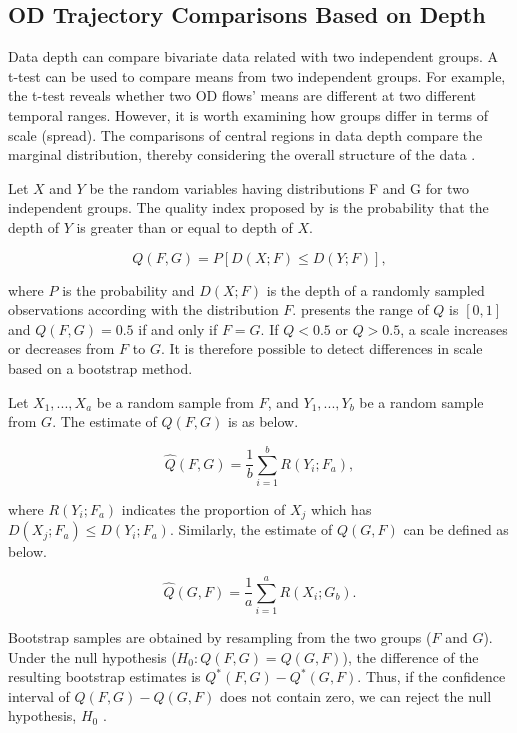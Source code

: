 \documentclass[a4paper,UKenglish]{lipics-v2016}
\begin{document}
\subsection{OD Trajectory Comparisons Based on Depth}
Data depth can compare bivariate data related with two independent groups. A t-test can be used to compare  means from two independent groups. For example, the t-test reveals whether two OD flows' means  are different at two different temporal ranges. However, it is worth examining how groups differ in terms of scale (spread). The comparisons of central regions in data depth compare the marginal distribution, thereby considering the overall structure of the data \cite{wilcox03MBR}.

Let $X$ and $Y$ be the random variables having distributions F and G for two independent groups. The quality index proposed by \cite{liu93JASA} is the probability that the depth of $Y$ is greater than or equal to depth of $X$. 

\begin{equation*}
Q(F,G) = P[D(X;F) \leq D(Y;F)],
\end{equation*}

where $P$ is the probability and $D(X;F)$ is the depth of a randomly sampled observations according with the distribution $F$. \cite{liu93JASA} presents the range of $Q$ is $[0,1]$ and $Q(F,G) = 0.5$ if and only if $F = G$. If $Q < 0.5$  or $Q > 0.5$, a scale increases or decreases from  $F$ to $G$.   It is therefore possible to detect differences in scale based on a bootstrap method.

Let $X_1,...,X_a$ be a random sample from $F$, and $Y_1,...,Y_b$ be a random sample from $G$. The estimate of $Q(F,G)$ is as below.

\begin{equation*}
\hat{Q}(F,G) =\frac{1}{b} \sum_{i=1}^{b} R(Y_i;F_a),
\end{equation*}

where $R(Y_i;F_a)$ indicates the proportion of $X_j$ which has $D(X_j;F_a) \leq D(Y_i;F_a)$. Similarly, the estimate of $Q(G,F)$ can be defined as below.

\begin{equation*}
\hat{Q}(G,F) =\frac{1}{a} \sum_{i=1}^{a} R(X_i;G_b).
\end{equation*}

Bootstrap samples are obtained by resampling from the two groups ($F$ and $G$). Under the null hypothesis ($H_0: Q(F,G) = Q(G,F)$), the difference of the resulting bootstrap estimates is $Q^*(F,G) - Q^*(G,F)$. Thus, if the confidence interval of $Q(F,G) - Q(G,F)$ does not contain zero, we can reject the null hypothesis, $H_0$ \cite{liu93JASA,wilcox03MBR}.
\end{document}
